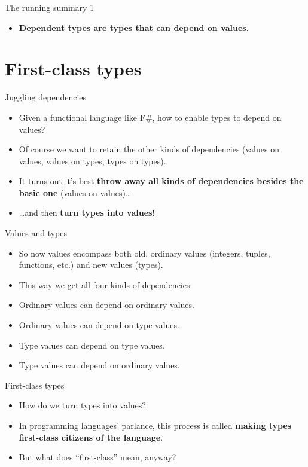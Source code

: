 \documentclass{beamer}
\begin{document}
\begin{frame}{The running summary 1}
\begin{itemize}
	\item \textbf{Dependent types are types that can depend on values}.
\end{itemize}
\end{frame}

\section{First-class types}

\begin{frame}{Juggling dependencies}
\begin{itemize}
	\item Given a functional language like F\#, how to enable types to depend on values?
	\item Of course we want to retain the other kinds of dependencies (values on values, values on types, types on types).
	\item It turns out it's best \textbf{throw away all kinds of dependencies besides the basic one} (values on values)\dots
	\item \dots and then \textbf{turn types into values}!
\end{itemize}
\end{frame}

\begin{frame}{Values and types}
\begin{itemize}
	\item So now values encompass both old, ordinary values (integers, tuples, functions, etc.) and new values (types).
	\item This way we get all four kinds of dependencies:
	\item Ordinary values can depend on ordinary values.
	\item Ordinary values can depend on type values.
	\item Type values can depend on type values.
	\item Type values can depend on ordinary values.
\end{itemize}
\end{frame}

\begin{frame}{First-class types}
\begin{itemize}
	\item How do we turn types into values?
	\item In programming languages' parlance, this process is called \textbf{making types first-class citizens of the language}.
	\item But what does ``first-class'' mean, anyway?
\end{itemize}
\end{frame}
\end{document}
